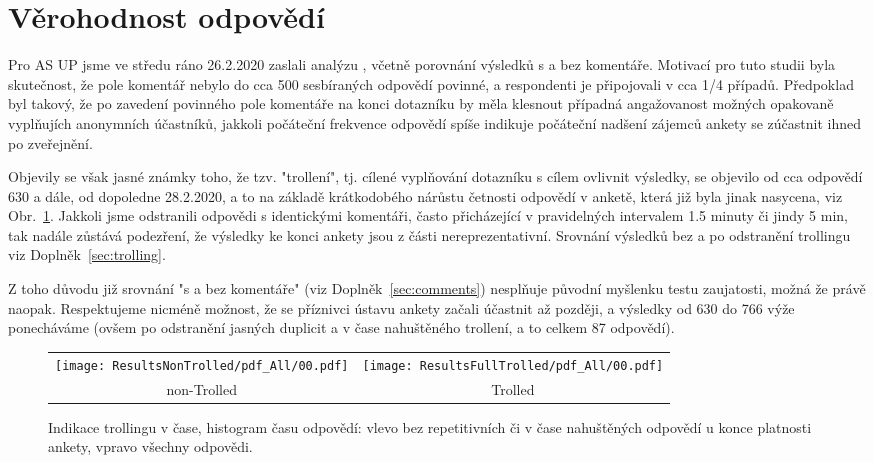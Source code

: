 \documentclass[a4paper,twoside]{article}
\begin{document}
\section{Věrohodnost odpovědí}
\label{sec:Sel}
Pro AS UP jsme ve středu ráno 26.2.2020 zaslali analýzu , včetně porovnání výsledků s a bez komentáře.
Motivací pro tuto studii byla skutečnost, že pole komentář nebylo do cca 500 sesbíraných odpovědí povinné, a respondenti je připojovali v cca 1/4 případů. Předpoklad byl takový, že po zavedení povinného pole komentáře na konci dotazníku by měla klesnout případná angažovanost možných opakovaně vyplňujích anonymních účastníků, jakkoli počáteční frekvence odpovědí spíše indikuje počáteční nadšení zájemců ankety se zúčastnit ihned po zveřejnění. 

Objevily se však jasné známky toho, že tzv. "trollení", tj. cílené vyplňování dotazníku s cílem ovlivnit výsledky, se objevilo od cca odpovědí 630 a dále, od dopoledne 28.2.2020, a to na základě krátkodobého nárůstu četnosti odpovědí v anketě, která již byla jinak nasycena, viz Obr.~\ref{fig:troll_indication}. Jakkoli jsme odstranili odpovědi s identickými komentáři, často přicházející v pravidelných intervalem 1.5 minuty či jindy 5 min, tak nadále zůstává podezření, že výsledky ke konci ankety jsou z části nereprezentativní. Srovnání výsledků bez a po odstranění trollingu viz Doplněk~\ref{sec:trolling}.

Z toho důvodu již srovnání "s a bez komentáře" (viz Doplněk~\ref{sec:comments}) nesplňuje původní myšlenku testu zaujatosti, možná že právě naopak. Respektujeme nicméně možnost, že se příznivci ústavu ankety začali účastnit až později, a výsledky od 630 do 766 výže ponecháváme (ovšem po odstranění jasných duplicit a v čase nahuštěného trollení, a to celkem 87 odpovědí). 


\begin{figure}[!h]
\begin{tabular}{cc}
{  \texttt{[image: ResultsNonTrolled/pdf\_All/00.pdf]} } & 
{  \texttt{[image: ResultsFullTrolled/pdf\_All/00.pdf]}} \\
 non-Trolled & Trolled \\

\end{tabular}
\caption{Indikace trollingu v čase, histogram času odpovědí: vlevo bez repetitivních či v čase nahuštěných odpovědí u konce platnosti ankety, vpravo všechny odpovědi.}
\label{fig:troll_indication}
\end{figure}
\end{document}
